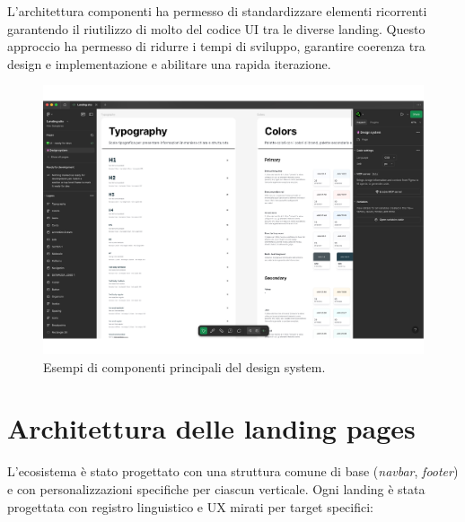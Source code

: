 L'architettura componenti ha permesso di standardizzare elementi ricorrenti 
garantendo il riutilizzo di molto del codice UI tra le diverse landing. Questo 
approccio ha permesso di ridurre i tempi di sviluppo, garantire coerenza tra 
design e implementazione e abilitare una rapida iterazione.

\begin{figure}[h!]
    \centering
    \includegraphics[width=\textwidth]{chapters/figures/design-system.pdf}
    \caption{Esempi di componenti principali del design system.}
    \label{fig:design-system}
\end{figure}

\clearpage
\section{Architettura delle landing pages}
L'ecosistema è stato progettato con una struttura comune di base (\textit{navbar}, 
\textit{footer}) e con personalizzazioni specifiche per ciascun verticale. 
Ogni landing è stata progettata con registro linguistico e UX mirati per target 
specifici:

